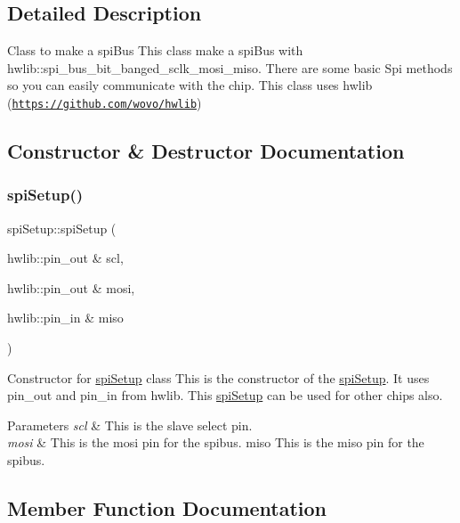 \subsection{Detailed Description}
Class to make a spi\+Bus  This class make a spi\+Bus with hwlib\+::spi\+\_\+bus\+\_\+bit\+\_\+banged\+\_\+sclk\+\_\+mosi\+\_\+miso. There are some basic Spi methods so you can easily communicate with the chip. This class uses hwlib (\href{https://github.com/wovo/hwlib}{\tt https\+://github.\+com/wovo/hwlib}) 

\subsection{Constructor \& Destructor Documentation}
\mbox{\label{classspiSetup_a4acc1a08e4a3ce57cb145b2fec525325}} 
\subsubsection{\texorpdfstring{spi\+Setup()}{spiSetup()}}
{\footnotesize\ttfamily spi\+Setup\+::spi\+Setup (\begin{DoxyParamCaption}\item[{hwlib\+::pin\+\_\+out \&}]{scl,  }\item[{hwlib\+::pin\+\_\+out \&}]{mosi,  }\item[{hwlib\+::pin\+\_\+in \&}]{miso }\end{DoxyParamCaption})}



Constructor for \hyperlink{classspiSetup}{spi\+Setup} class  This is the constructor of the \hyperlink{classspiSetup}{spi\+Setup}. It uses pin\+\_\+out and pin\+\_\+in from hwlib. This \hyperlink{classspiSetup}{spi\+Setup} can be used for other chips also. 


\begin{DoxyParams}{Parameters}
{\em scl} & This is the slave select pin. \\
\hline
{\em mosi} & This is the mosi pin for the spibus.  miso This is the miso pin for the spibus. \\
\hline
\end{DoxyParams}


\subsection{Member Function Documentation}
\mbox{\label{classspiSetup_a8c4709981af56eb9886f57a58fc15349}} 
